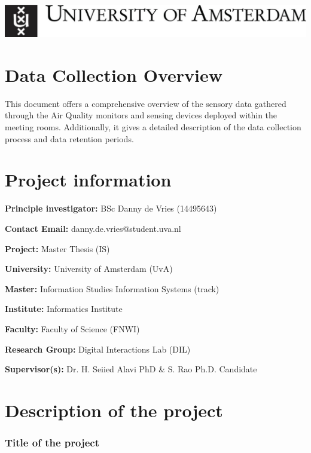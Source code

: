 \documentclass[a4paper]{article}
\begin{document}
\includegraphics[scale=0.2]{uva-logo.jpg} \\

\section*{Data Collection Overview}
This document offers a comprehensive overview of the sensory data gathered through the Air Quality monitors and sensing devices deployed within the meeting rooms. Additionally, it gives a detailed description of the data collection process and data retention periods.

\section*{Project information}

\begin{description}
  \item \textbf{Principle investigator:} BSc Danny de Vries (14495643)
  \item \textbf{Contact Email:} danny.de.vries@student.uva.nl
  \item \textbf{Project:} Master Thesis (IS)
  \item \textbf{University:} University of Amsterdam (UvA)
  \item \textbf{Master:} Information Studies Information Systems (track)
  \item \textbf{Institute:} Informatics Institute
  \item \textbf{Faculty:} Faculty of Science (FNWI)
  \item \textbf{Research Group:} Digital Interactions Lab (DIL)
  \item \textbf{Supervisor(s):} Dr. H. Seiied Alavi PhD \& S. Rao Ph.D. Candidate
\end{description}

\section*{Description of the project}

\subsubsection{Title of the project}
\end{document}
